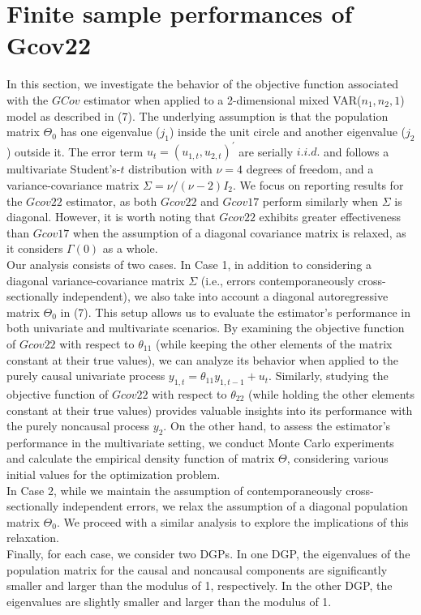 \documentclass[<1p>]{elsarticle} %
\begin{document}
\section{Finite sample performances of Gcov22}
In this section, we investigate the behavior of the objective function associated with the $GCov$ estimator when applied to a 2-dimensional mixed VAR($n_1, n_2, 1$) model as described in (7). The underlying assumption is that the population matrix $\Theta_0$ has one eigenvalue ($j_1$) inside the unit circle and another eigenvalue ($j_2$) outside it. The error term $u_t = (u_{1,t}, u_{2,t})^{\prime}$ are serially $i.i.d.$ and follows a multivariate Student's-$t$ distribution with $\nu = 4$ degrees of freedom, and a variance-covariance matrix $\Sigma = \nu / (\nu - 2)I_{2}$. We focus on reporting results for the $Gcov22$ estimator, as both $Gcov22$ and $Gcov17$ perform similarly when $\Sigma$ is diagonal. However, it is worth noting that $Gcov22$ exhibits greater effectiveness than $Gcov17$ when the assumption of a diagonal covariance matrix is relaxed, as it considers $\Gamma(0)$ as a whole.\\
\indent Our analysis consists of two cases. In Case 1, in addition to considering a diagonal variance-covariance matrix $\Sigma$ (i.e., errors contemporaneously cross-sectionally independent), we also take into account a diagonal autoregressive matrix $\Theta_0$ in (7). This setup allows us to evaluate the estimator's performance in both univariate and multivariate scenarios. By examining the objective function of $Gcov22$ with respect to $\theta_{11}$ (while keeping the other elements of the matrix constant at their true values), we can analyze its behavior when applied to the purely causal univariate process $y_{1,t}=\theta_{11}y_{1,t-1}+u_{t}$. Similarly, studying the objective function of $Gcov22$ with respect to $\theta_{22}$ (while holding the other elements constant at their true values) provides valuable insights into its performance with the purely noncausal process $y_2$. On the other hand, to assess the estimator's performance in the multivariate setting, we conduct Monte Carlo experiments and calculate the empirical density function of matrix $\Theta$, considering various initial values for the optimization problem.\\
\indent In Case 2, while we maintain the assumption of contemporaneously cross-sectionally independent errors, we relax the assumption of a diagonal population matrix $\Theta_0$. We proceed with a similar analysis to explore the implications of this relaxation.\\ 
\indent Finally, for each case, we consider two DGPs. In one DGP, the eigenvalues of the population matrix for the causal and noncausal components are significantly smaller and larger than the modulus of 1, respectively. In the other DGP, the eigenvalues are slightly smaller and larger than the modulus of 1.
\end{document}
